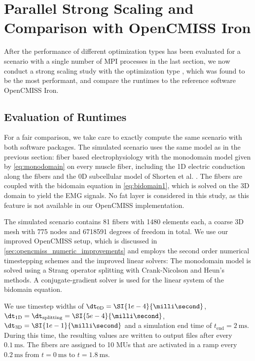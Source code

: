 


%
\section{Parallel Strong Scaling and Comparison with OpenCMISS Iron}\label{sec:parallel_strong_scaling_opencmiss}

After the performance of different optimization types has been evaluated for a scenario with a single number of MPI processes in the last section, we now conduct a strong scaling study with the optimization type , which was found to be the most performant, and compare the runtimes to the reference software OpenCMISS Iron.

\subsection{Evaluation of Runtimes}\label{sec:strong_scaling_runtimes_opencmiss_opendihu}
For a fair comparison, we take care to exactly compute the same scenario with both software packages. The simulated scenario uses the same model as in the previous section: fiber based electrophysiology with the monodomain model given by \cref{eq:monodomain} on every muscle fiber, including the 1D electric conduction along the fibers and the 0D subcellular model of Shorten et al. \cite{Shorten2007}. The fibers are coupled with the bidomain equation in \cref{eq:bidomain1}, which is solved on the 3D domain to yield the EMG signals. No fat layer is considered in this study, as this feature is not available in our OpenCMISS implementation.

The simulated scenario contains 81 fibers with \num{1480} elements each, a coarse 3D mesh with \num{775} nodes and \num{6718591} degrees of freedom in total. 
We use our improved OpenCMISS setup, which is discussed in \cref{sec:opencmiss_numeric_improvements} and employs the second order numerical timestepping schemes and the improved linear solvers:
The monodomain model is solved using a Strang operator splitting with Crank-Nicolson and Heun's methods. A conjugate-gradient solver is used for the linear system of the bidomain equation.

We use timestep widths of $\dt_\text{0D}=\SI{1e-4}{\milli\second}$, $\dt_\text{1D}=\dt_\text{splitting}=\SI{5e-4}{\milli\second}$, $\dt_\text{3D}=\SI{1e-1}{\milli\second}$ and a simulation end time of $t_\text{end}=\SI{2}{\milli\second}$. 
During this time, the resulting values are written to output files after every $\SI{0.1}{\milli\second}$. 
The fibers are assigned to 10 MUs that are activated in a ramp every $\SI{0.2}{\milli\second}$ from $t=\SI{0}{\milli\second}$ to $t=\SI{1.8}{\milli\second}$.

